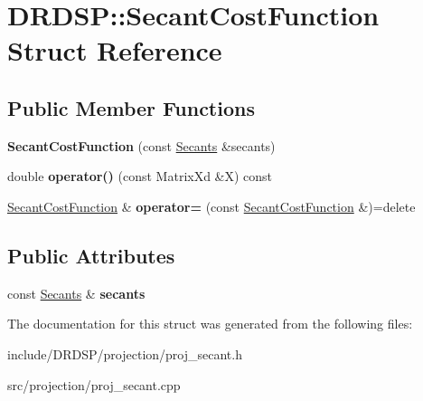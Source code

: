 \hypertarget{struct_d_r_d_s_p_1_1_secant_cost_function}{\section{D\-R\-D\-S\-P\-:\-:Secant\-Cost\-Function Struct Reference}
\label{struct_d_r_d_s_p_1_1_secant_cost_function}
}
\subsection*{Public Member Functions}
\begin{DoxyCompactItemize}
\item 
\hypertarget{struct_d_r_d_s_p_1_1_secant_cost_function_a65f6e228d300f5b878ec5d4d695d0a21}{{\bfseries Secant\-Cost\-Function} (const \hyperlink{struct_d_r_d_s_p_1_1_secants}{Secants} \&secants)}\label{struct_d_r_d_s_p_1_1_secant_cost_function_a65f6e228d300f5b878ec5d4d695d0a21}

\item 
\hypertarget{struct_d_r_d_s_p_1_1_secant_cost_function_ad30d19180f9c1e9dac7f9ae87296a0f8}{double {\bfseries operator()} (const Matrix\-Xd \&X) const }\label{struct_d_r_d_s_p_1_1_secant_cost_function_ad30d19180f9c1e9dac7f9ae87296a0f8}

\item 
\hypertarget{struct_d_r_d_s_p_1_1_secant_cost_function_aaeb28d84d544410b913b7a6eaecfa7e2}{\hyperlink{struct_d_r_d_s_p_1_1_secant_cost_function}{Secant\-Cost\-Function} \& {\bfseries operator=} (const \hyperlink{struct_d_r_d_s_p_1_1_secant_cost_function}{Secant\-Cost\-Function} \&)=delete}\label{struct_d_r_d_s_p_1_1_secant_cost_function_aaeb28d84d544410b913b7a6eaecfa7e2}

\end{DoxyCompactItemize}
\subsection*{Public Attributes}
\begin{DoxyCompactItemize}
\item 
\hypertarget{struct_d_r_d_s_p_1_1_secant_cost_function_a4bd8e4d46ad76dec7d8d1ffa279f7535}{const \hyperlink{struct_d_r_d_s_p_1_1_secants}{Secants} \& {\bfseries secants}}\label{struct_d_r_d_s_p_1_1_secant_cost_function_a4bd8e4d46ad76dec7d8d1ffa279f7535}

\end{DoxyCompactItemize}


The documentation for this struct was generated from the following files\-:\begin{DoxyCompactItemize}
\item 
include/\-D\-R\-D\-S\-P/projection/proj\-\_\-secant.\-h\item 
src/projection/proj\-\_\-secant.\-cpp\end{DoxyCompactItemize}
